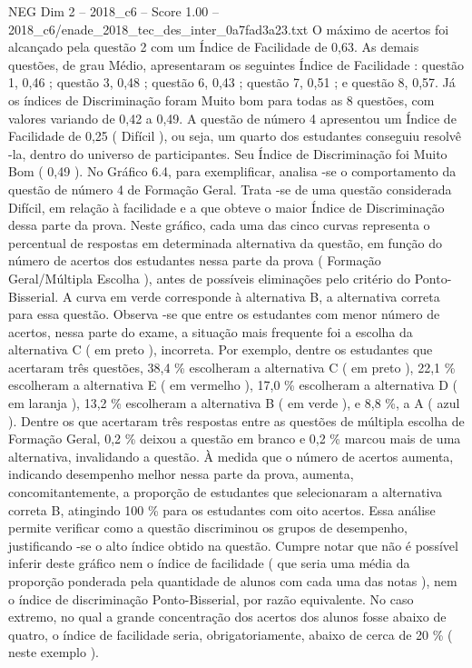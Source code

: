 \begin{textsample}{NEG Dim 2 – 2018\_c6 – Score 1.00 – 2018\_c6/enade\_2018\_tec\_des\_inter\_0a7fad3a23.txt}
O máximo de acertos foi alcançado pela questão 2 com um Índice de Facilidade de 0,63.
As demais questões, de grau Médio, apresentaram os seguintes Índice de Facilidade : questão 1, 0,46 ; questão 3, 0,48 ; questão 6, 0,43 ; questão 7, 0,51 ; e questão 8, 0,57.
Já os índices de Discriminação foram Muito bom para todas as 8 questões, com valores variando de 0,42 a 0,49.
A questão de número 4 apresentou um Índice de Facilidade de 0,25 ( Difícil ), ou seja, um quarto dos estudantes conseguiu resolvê -la, dentro do universo de participantes.
Seu Índice de Discriminação foi Muito Bom ( 0,49 ).
No Gráfico 6.4, para exemplificar, analisa -se o comportamento da questão de número 4 de Formação Geral.
Trata -se de uma questão considerada Difícil, em relação à facilidade e a que obteve o maior Índice de Discriminação dessa parte da prova.
Neste gráfico, cada uma das cinco curvas representa o percentual de respostas em determinada alternativa da questão, em função do número de acertos dos estudantes nessa parte da prova ( Formação Geral/Múltipla Escolha ), antes de possíveis eliminações pelo critério do Ponto-Bisserial.
A curva em verde corresponde à alternativa B, a alternativa correta para essa questão.
Observa -se que entre os estudantes com menor número de acertos, nessa parte do exame, a situação mais frequente foi a escolha da alternativa C ( em preto ), incorreta.
Por exemplo, dentre os estudantes que acertaram três questões, 38,4 \% escolheram a alternativa C ( em preto ), 22,1 \% escolheram a alternativa E ( em vermelho ), 17,0 \% escolheram a alternativa D ( em laranja ), 13,2 \% escolheram a alternativa B ( em verde ), e 8,8 \%, a A ( azul ).
Dentre os que acertaram três respostas entre as questões de múltipla escolha de Formação Geral, 0,2 \% deixou a questão em branco e 0,2 \% marcou mais de uma alternativa, invalidando a questão.
À medida que o número de acertos aumenta, indicando desempenho melhor nessa parte da prova, aumenta, concomitantemente, a proporção de estudantes que selecionaram a alternativa correta B, atingindo 100 \% para os estudantes com oito acertos.
Essa análise permite verificar como a questão discriminou os grupos de desempenho, justificando -se o alto índice obtido na questão.
Cumpre notar que não é possível inferir deste gráfico nem o índice de facilidade ( que seria uma média da proporção ponderada pela quantidade de alunos com cada uma das notas ), nem o índice de discriminação Ponto-Bisserial, por razão equivalente.
No caso extremo, no qual a grande concentração dos acertos dos alunos fosse abaixo de quatro, o índice de facilidade seria, obrigatoriamente, abaixo de cerca de 20 \% ( neste exemplo ).

\end{textsample}
